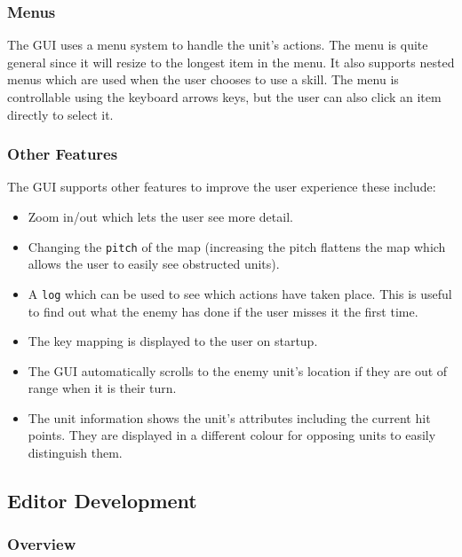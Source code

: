 
\subsubsection{Menus}

The GUI uses a menu system to handle the unit's actions. The menu is quite general since it will resize to the longest item in the menu.  It also supports nested menus which are used when the user chooses to use a skill. The menu is controllable using the keyboard arrows keys, but the user can also click an item directly to select it.



\subsubsection{Other Features}
The GUI supports other features to improve the user experience these include:

\begin{itemize}
	\item Zoom in/out which lets the user see more detail. 
	\item Changing the \texttt{pitch} of the map (increasing the pitch flattens the map which allows the user to easily see obstructed units).
	\item A \texttt{log} which can be used to see which actions have taken place. This is useful to find out what the enemy has done if the user misses it the first time.
	\item The key mapping is displayed to the user on startup.
	\item The GUI automatically scrolls to the enemy unit's location if they are out of range when it is their turn.
	\item The unit information shows the unit's attributes including the current hit points. They are displayed in a different colour for opposing units to easily distinguish them. 
\end{itemize}


\subsection{Editor Development}

\subsubsection{Overview}
\label{ssub:overview}

